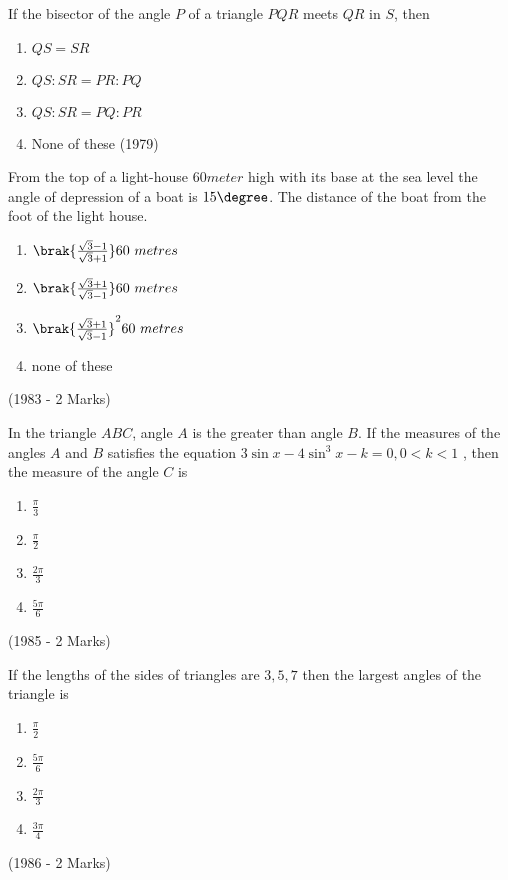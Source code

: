 \iffalse
\title{Properties of Triangle}
\author{ee24btech11051 - Prajwal}
\section{mcq-multiple}
\fi
    \item If the bisector of the angle $P$ of a triangle $PQR$ meets $QR$ in $S$, then
\begin{multicols}{4}
    \begin{enumerate}
        \item $QS = SR$
        \item $QS : SR = PR : PQ$
        \item $QS : SR = PQ : PR$
        \item None of these \hfill (1979)
    \end{enumerate}
\end{multicols}
    \item From the top of a light-house $60 meter$ high with its base at the sea level the angle of depression of a boat is  $15\degree$. The distance of the boat from the foot of the light house.
	    \begin{multicols}{2}    
\begin{enumerate}
    \item $\brak{\frac{\sqrt{3}-1}{\sqrt{3}+1}}60\ metres $
    \item $\brak{\frac{\sqrt{3}+1}{\sqrt{3}-1}}60\ metres $
    \item $\brak{\frac{\sqrt{3}+1}{\sqrt{3}-1}}^2 60\ metres $
    \item none of these 
\end{enumerate}
	    \end{multicols}
		 \hfill (1983 - 2 Marks)
    \item In the triangle $ABC$, angle $A$ is the greater than angle $B$. If the measures of the angles $A$ and $B$ satisfies the equation $3\sin x - 4 \sin^3 x - k = 0, 0<k<1$ , then the measure of the angle $C$ is 
	    \begin{multicols}{2}
	    \begin{enumerate}
     \item $\frac{\pi}{3}$
     \item $\frac{\pi}{2}$
     \item $\frac{2\pi}{3}$
     \item $\frac{5\pi}{6}$ 
\end{enumerate}
	    \end{multicols}
		\hfill (1985 - 2 Marks)
    \item If the lengths of the sides of triangles are $3,5,7$ then the largest angles of the triangle is
	    \begin{multicols}{2}
	    \begin{enumerate}
     \item $\frac{\pi}{2}$
     \item $\frac{5\pi}{6}$
     \item $\frac{2\pi}{3}$
     \item $\frac{3\pi}{4}$ 
	    \end{enumerate}
	    \end{multicols}
		\hfill (1986 - 2 Marks)
%



